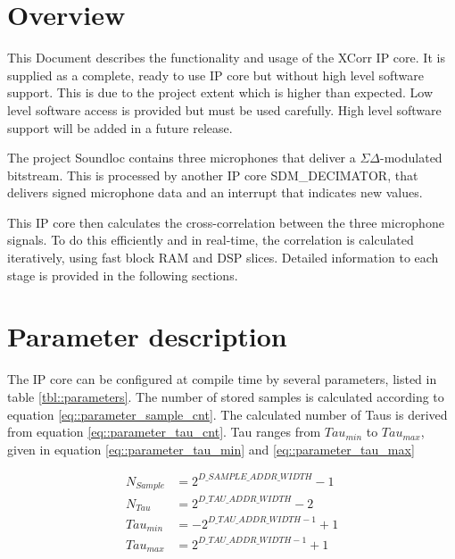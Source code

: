 


\maketitle

\section{Overview}
\label{sec:overview}

This Document describes the functionality and usage of the XCorr IP core.
It is supplied as a complete, ready to use IP core but without high level software support.
This is due to the project extent which is higher than expected.
Low level software access is provided but must be used carefully.
High level software support will be added in a future release.

The project Soundloc contains three microphones that deliver a $\Sigma\Delta$-modulated bitstream.
This is processed by another IP core SDM\_DECIMATOR, that delivers signed microphone data and an interrupt that indicates new values.

This IP core then calculates the cross-correlation between the three microphone signals.
To do this efficiently and in real-time, the correlation is calculated iteratively, using fast block RAM and DSP slices.
Detailed information to each stage is provided in the following sections.

\section{Parameter description}
\label{sec::parameters}

The IP core can be configured at compile time by several parameters, listed in table \ref{tbl::parameters}.
The number of stored samples is calculated according to equation \ref{eq::parameter_sample_cnt}.
The calculated number of Taus is derived from equation \ref{eq::parameter_tau_cnt}.
Tau ranges from $Tau_{min}$ to $Tau_{max}$, given in equation \ref{eq::parameter_tau_min} and \ref{eq::parameter_tau_max}

\begin{align}
	N_{Sample} &= 2^{D\_SAMPLE\_ADDR\_WIDTH}-1 \label{eq::parameter_sample_cnt} \\
	N_{Tau} &=2^{D\_TAU\_ADDR\_WIDTH}-2 \label{eq::parameter_tau_cnt} \\
	Tau_{min} &= -2^{D\_TAU\_ADDR\_WIDTH - 1}+1 \label{eq::parameter_tau_min} \\
	Tau_{max} &= 2^{D\_TAU\_ADDR\_WIDTH - 1}+1 \label{eq::parameter_tau_max}
\end{align}


